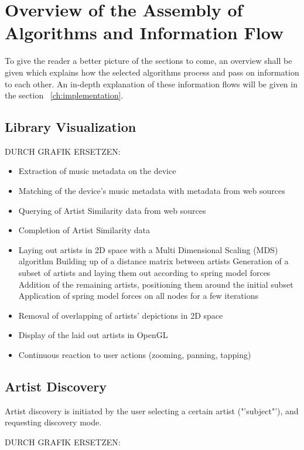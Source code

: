 \section{Overview of the Assembly of Algorithms and Information Flow}

To give the reader a better picture of the sections to come, an overview shall be given which explains how the selected algorithms process and pass on information to each other. An in-depth explanation of these information flows will be given in the section ~\ref{ch:implementation}.

\subsection{Library Visualization}

DURCH GRAFIK ERSETZEN:

\begin{itemize}
	\item Extraction of music metadata on the device
	\item Matching of the device's music metadata with metadata from web sources
	\item Querying of Artist Similarity data from web sources
	\item Completion of Artist Similarity data
	\item Laying out artists in 2D space with a Multi Dimensional Scaling (MDS) algorithm
		\subitem Building up of a distance matrix between artists
		\subitem Generation of a subset of artists and laying them out according to spring model forces
		\subitem Addition of the remaining artists, positioning them around the initial subset
		\subitem Application of spring model forces on all nodes for a few iterations
	\item Removal of overlapping of artists' depictions in 2D space
	\item Display of the laid out artists in OpenGL
	\item Continuous reaction to user actions (zooming, panning, tapping) 
\end{itemize}

\subsection{Artist Discovery}

Artist discovery is initiated by the user selecting a certain artist ("'subject"'), and requesting discovery mode.

DURCH GRAFIK ERSETZEN:

